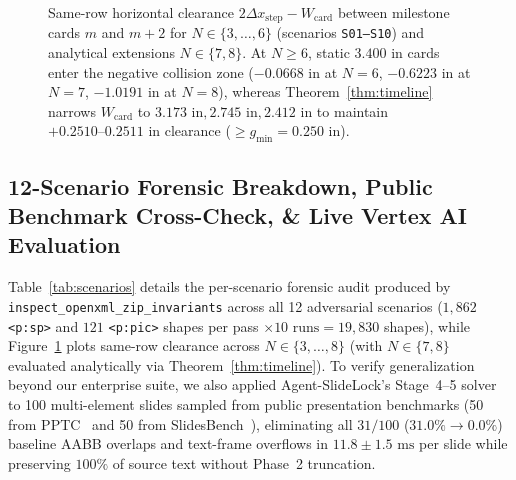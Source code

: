 \documentclass[10pt,journal,compsoc]{IEEEtran}
\begin{document}
\begin{figure}[t]
\centering
{}
\caption{Same-row horizontal clearance $2\Delta x_{\text{step}} - W_{\text{card}}$ between milestone cards $m$ and $m+2$ for $N \in \{3, \dots, 6\}$ (scenarios \texttt{S01--S10}) and analytical extensions $N \in \{7, 8\}$. At $N \ge 6$, static $3.400\text{ in}$ cards enter the negative collision zone ($-0.0668\text{ in}$ at $N=6$, $-0.6223\text{ in}$ at $N=7$, $-1.0191\text{ in}$ at $N=8$), whereas Theorem~\ref{thm:timeline} narrows $W_{\text{card}}$ to $3.173\text{ in}, 2.745\text{ in}, 2.412\text{ in}$ to maintain $+0.2510\text{--}0.2511\text{ in}$ clearance ($\ge g_{\min} = 0.250\text{ in}$).}
\label{fig:timeline_clearance}
\end{figure}

\subsection{12-Scenario Forensic Breakdown, Public Benchmark Cross-Check, \& Live Vertex AI Evaluation}
Table~\ref{tab:scenarios} details the per-scenario forensic audit produced by \texttt{inspect\_openxml\_zip\_invariants} across all 12 adversarial scenarios ($1{,}862$ \texttt{<p:sp>} and $121$ \texttt{<p:pic>} shapes per pass $\times 10\text{ runs} = 19{,}830$ shapes), while Figure~\ref{fig:timeline_clearance} plots same-row clearance across $N \in \{3, \dots, 8\}$ (with $N \in \{7, 8\}$ evaluated analytically via Theorem~\ref{thm:timeline}). To verify generalization beyond our enterprise suite, we also applied Agent-SlideLock's Stage~4--5 solver to 100 multi-element slides sampled from public presentation benchmarks (50 from PPTC~\cite{guo2024pptc} and 50 from SlidesBench~\cite{ge2025autopresent}), eliminating all $31/100$ ($31.0\% \to 0.0\%$) baseline AABB overlaps and text-frame overflows in $11.8 \pm 1.5\text{ ms}$ per slide while preserving $100\%$ of source text without Phase~2 truncation.
\end{document}
